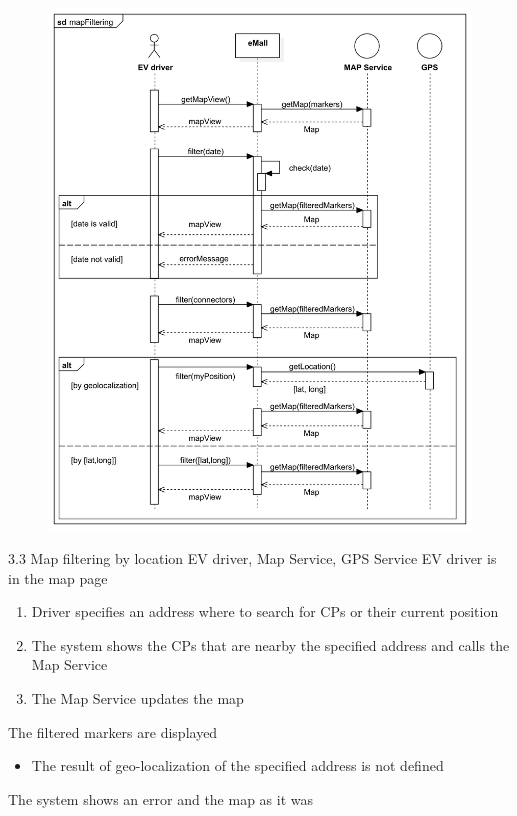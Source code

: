 \usecase
{
    \begin{figure}[H]
        \centering
        \includegraphics[scale=0.9]{src/sequence_diagram/mapFiltering.png}
    \end{figure}
}
{3.3}
{Map filtering by location}
{EV driver, Map Service, GPS Service}
{EV driver is in the map page}
{
    \begin{enumerate}
        \item Driver specifies an address where to search for CPs or their current position
        \item The system shows the CPs that are nearby the specified address and calls the Map Service
        \item The Map Service updates the map
    \end{enumerate}
}
{The filtered markers are displayed}
{
    \begin{itemize}
        \item The result of geo-localization of the specified address is not defined
    \end{itemize}
}
{
    The system shows an error and the map as it was
}

